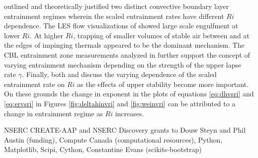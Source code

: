 \cite{Turner86} outlined and theoretically justified two distinct convective boundary layer entrainment regimes wherein the scaled entrainment rates have different $Ri$ dependence. The LES flow visualizations of \cite{SullMoengStev} showed large scale engulfment at lower $Ri$.  At higher $Ri$, trapping of smaller volumes of stable air between and at the edges of impinging thermals appeared to be the dominant mechanism. The CBL entrainment zone measurements analyzed in \cite{Traum11} further support the concept of varying entrainment mechanism depending on the strength of the upper lapse rate $\gamma$.  Finally, both \cite{FedConzMir04} and \cite{GarciaMellado} discuss the varying dependence of the scaled entrainment rate on $Ri$ as the effects of upper stability become more important.  On these grounds the change in exponent in the plots of equations \ref{eq:dhvsri} and \ref{eq:ervsri} in Figures \ref{fig:deltahinvri} and \ref{fig:weinvri} can be attributed to a change in entrainment regime as $Ri$ increases.   



\begin{acknowledgements}
NSERC CREATE-AAP and NSERC Discovery grants to Douw Steyn and Phil Austin (funding), Compute Canada (computational resources), Python, Matplotlib, Scipi, Cython, Constantine Evans (scikits-bootstrap) 
\end{acknowledgements}








